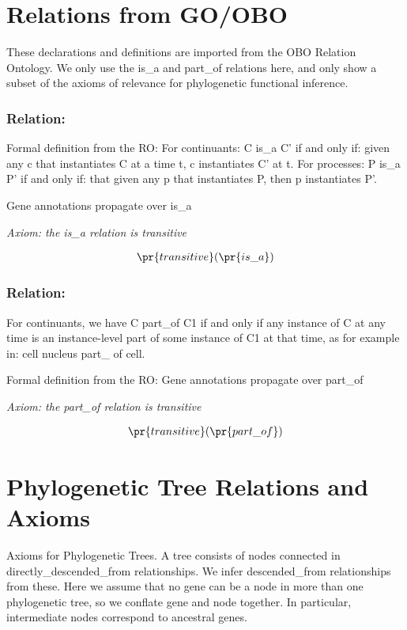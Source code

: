 \section{Relations from GO/OBO}
These declarations and
definitions are imported from the OBO Relation Ontology. We only use
the is\_a and part\_of relations here, and only show a subset of the
axioms of relevance for phylogenetic functional inference.
\subsubsection{Relation:  }


Formal definition from the RO: For continuants:
C is\_a C' if and only if: given any c that instantiates C at a time t,
c instantiates C' at t. For processes: P is\_a P' if and only if: that
given any p that instantiates P, then p instantiates P'.

Gene annotations propagate over is\_a

\emph{Axiom: the is\_a relation is transitive}

\begin{eqnarray*}
 \pr{transitive}( \pr{is\_a}) 
\end{eqnarray*}
\subsubsection{Relation:  }


For continuants, we have C part\_of C1 if and only if any instance of C at any time is an instance-level part of some instance of C1 at that time, as for example in: cell nucleus part\_ of cell.

Formal definition from the RO: Gene annotations propagate over part\_of

\emph{Axiom: the part\_of relation is transitive}

\begin{eqnarray*}
 \pr{transitive}( \pr{part\_of}) 
\end{eqnarray*}
\section{Phylogenetic Tree Relations and Axioms}
Axioms for
Phylogenetic Trees. A tree consists of nodes connected in
directly\_descended\_from relationships. We infer descended\_from
relationships from these. Here we assume that no gene can be a node in
more than one phylogenetic tree, so we conflate gene and node
together. In particular, intermediate nodes correspond to ancestral
genes.
